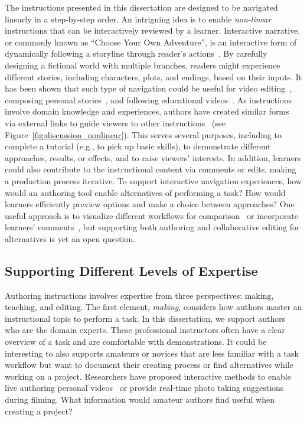 The instructions presented in this dissertation are designed to be navigated linearly in a step-by-step order. An intriguing idea is to enable \emph{non-linear} instructions that can be interactively reviewed by a learner. Interactive narrative, or commonly known as ``Choose Your Own Adventure'', is an interactive form of dynamically following a storyline through reader's actions~\cite{RiedlInteractivenarrative}. By carefully designing a fictional world with multiple branches, readers might experience different stories, including characters, plots, and endings, based on their inputs.
%
It has been shown that such type of navigation could be useful for video editing~\cite{Shen:2009:WNE:1518701.1518825}, composing personal stories~\cite{Chi:2011:IAC:1943403.1943438}, and following educational videos~\cite{Kim:2014:DIT:2642918.2647389}.
%
As instructions involve domain knowledge and experiences, authors have created similar forms via external links to guide viewers to other instructions~\cite{Wakkary:2015:TAH:2702123.2702550} (see Figure~\ref{fig:discussion_nonlinear}). This serves several purposes, including to complete a tutorial (e.g., to pick up basic skills), to demonstrate different approaches, results, or effects, and to raise viewers' interests.
%
In addition, learners could also contribute to the instructional content via comments or edits, making a production process iterative.
To support interactive navigation experiences, how would an authoring tool enable alternatives of performing a task? How would learners efficiently preview options and make a choice between approaches?
%
One useful approach is to visualize different workflows for comparison~\cite{Kong:2012:DTR:2207676.2208549} or incorporate learners' comments~\cite{Bunt:2014:TPI:2556288.2557118}, but supporting both authoring and collaborative editing for alternatives is yet an open question.

\subsection{Supporting Different Levels of Expertise}
Authoring instructions involves expertise from three perspectives: making, teaching, and editing.
%
The first element, \emph{making}, considers how authors master an instructional topic to perform a task. In this dissertation, we support authors who are the domain experts. These professional instructors often have a clear overview of a task and are comfortable with demonstrations. It could be interesting to also supports amateurs or novices that are less familiar with a task workflow but want to document their creating process or find alternatives while working on a project. Researchers have proposed interactive methods to enable live authoring personal videos~\cite{Freeman:2014:LLA:2611105.2557304} or provide real-time photo taking suggestions~\cite{Bourke:2011:SCC:1943403.1943408} during filming. What information would amateur authors find useful when creating a project?

